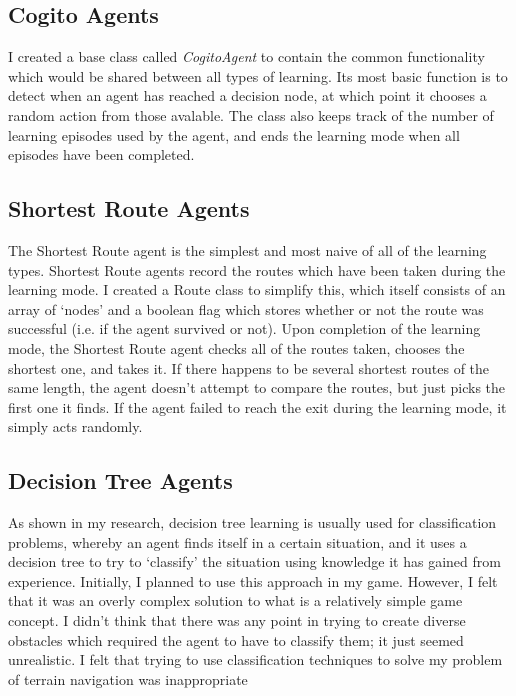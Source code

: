 \documentclass[a4paper,oneside]{report}
\begin{document}
\subsection{Cogito Agents}

I created a base class called \emph{CogitoAgent} to contain the common functionality which would be shared between all types of learning. Its most basic function is to detect when an agent has reached a decision node, at which point it chooses a random action from those avalable. The class also keeps track of the number of learning episodes used by the agent, and ends the learning mode when all episodes have been completed.

\subsection{Shortest Route Agents}

The Shortest Route agent is the simplest and most naive of all of the learning types. Shortest Route agents record the routes which have been taken during the learning mode. I created a Route class to simplify this, which itself consists of an array of `nodes' and a boolean flag which stores whether or not the route was successful (i.e. if the agent survived or not). Upon completion of the learning mode, the Shortest Route agent checks all of the routes taken, chooses the shortest one, and takes it. If there happens to be several shortest routes of the same length, the agent doesn't attempt to compare the routes, but just picks the first one it finds. If the agent failed to reach the exit during the learning mode, it simply acts randomly.

\subsection{Decision Tree Agents}

As shown in my research, decision tree learning is usually used for classification problems, whereby an agent finds itself in a certain situation, and it uses a decision tree to try to `classify' the situation using knowledge it has gained from experience. Initially, I planned to use this approach in my game. However, I felt that it was an overly complex solution to what is a relatively simple game concept. I didn't think that there was any point in trying to create diverse obstacles which required the agent to have to classify them; it just seemed unrealistic. I felt that trying to use classification techniques to solve my problem of terrain navigation was inappropriate
 
\end{document}
